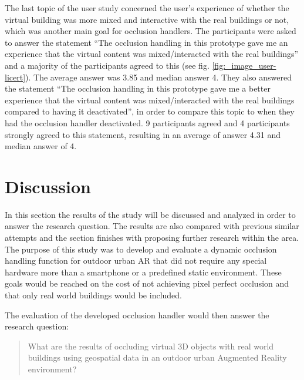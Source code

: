 The last topic of the user study concerned the user's experience of whether the virtual building was more mixed and interactive with the real buildings or not, which was another main goal for occlusion handlers. The participants were asked to answer the statement ``The occlusion handling in this prototype gave me an experience that the virtual content was mixed/interacted with the real buildings'' and a majority of the participants agreed to this (see fig. \ref{fig:_image_user-licert}). The average answer was 3.85 and median answer 4. They also answered the statement ``The occlusion handling in this prototype gave me a better experience that the virtual content was mixed/interacted with the real buildings compared to having it deactivated'', in order to compare this topic to when they had the occlusion handler deactivated. 9 participants agreed and 4 participants strongly agreed to this statement, resulting in an average of answer 4.31 and median answer of 4.

\section{Discussion}
In this section the results of the study will be discussed and analyzed in order to answer the research question. The results are also  compared with previous similar attempts and the section finishes with proposing further research within the area. 
The purpose of this study was to develop and evaluate a dynamic occlusion handling function for outdoor urban AR that did not require any special hardware more than a smartphone or a predefined static environment. These goals would be reached on the cost of not achieving pixel perfect occlusion and that only real world buildings would be included. 

The evaluation of the developed occlusion handler would then answer the research question:
\begin{quote}
What are the results of occluding virtual 3D objects with real world buildings using geospatial data in an outdoor urban Augmented Reality environment?
\end{quote}

